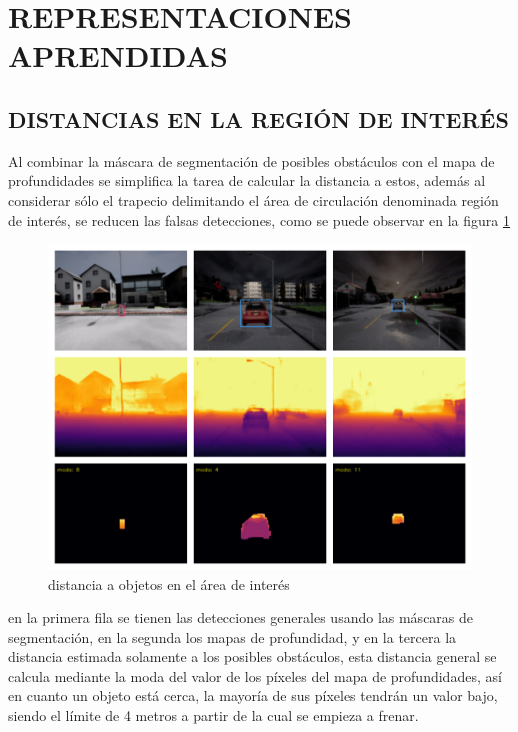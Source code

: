 \section{REPRESENTACIONES APRENDIDAS} \label{representaciones-aprendidas}
\subsection{DISTANCIAS EN LA REGIÓN DE INTERÉS}
Al combinar la máscara de segmentación de posibles obstáculos con el mapa de profundidades se simplifica la tarea de calcular la distancia a estos, además al considerar sólo el trapecio delimitando el área de circulación denominada región de interés, se reducen las falsas detecciones, como se puede observar en la figura \ref{distpred}

\begin{figure}[H]
	\centering
	\includegraphics[scale=0.6]{imagenes/preds/distance}
	\caption[Distancia a de objetos]{distancia a objetos en el área de interés}
	\label{distpred}
\end{figure}

en la primera fila se tienen las detecciones generales usando las máscaras de segmentación, en la segunda los mapas de profundidad, y en la tercera la distancia estimada solamente a los posibles obstáculos, esta distancia general se calcula mediante la moda del valor de los píxeles del mapa de profundidades, así en cuanto un objeto está cerca, la mayoría de sus píxeles tendrán un valor bajo, siendo el límite de 4 metros a partir de la cual se empieza a frenar.

